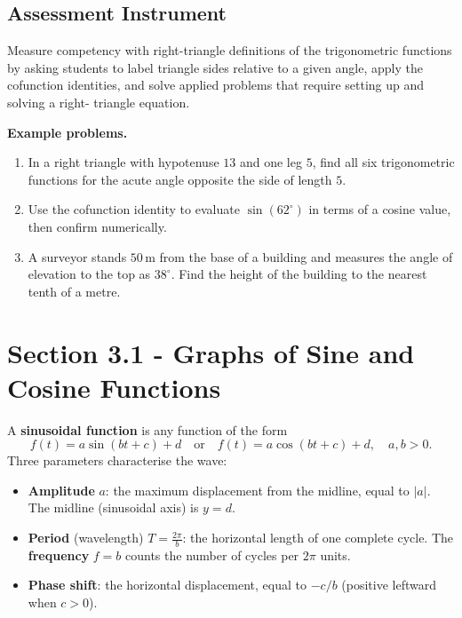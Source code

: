 \subsection{Assessment Instrument}
\label{ssec:asse-3669}

Measure competency with right-triangle definitions of the trigonometric functions by
asking students to label triangle sides relative to a given angle, apply the cofunction
identities, and solve applied problems that require setting up and solving a right-
triangle equation.

\textbf{Example problems.}
\begin{enumerate}
    \item In a right triangle with hypotenuse $13$ and one leg $5$, find all six trigonometric functions for the acute angle opposite the side of length $5$.
    \item Use the cofunction identity to evaluate $\sin(62^{\circ})$ in terms of a cosine value, then confirm numerically.
    \item A surveyor stands $50\,\text{m}$ from the base of a building and measures the angle of elevation to the top as $38^{\circ}$. Find the height of the building to the nearest tenth of a metre.
\end{enumerate}

\section{Section 3.1 - Graphs of Sine and Cosine Functions}
\label{sec:sect-7809}

A \textbf{sinusoidal function} is any function of the form
\[
  f(t) = a\sin(bt + c) + d \quad \text{or} \quad f(t) = a\cos(bt + c) + d,
  \quad a, b > 0.
\]
Three parameters characterise the wave:

\begin{itemize}
  \item \textbf{Amplitude} $a$: the maximum displacement from the midline,
        equal to $|a|$.  The midline (sinusoidal axis) is $y = d$.
  \item \textbf{Period} (wavelength) $T = \frac{2\pi}{b}$: the horizontal
        length of one complete cycle.  The \textbf{frequency} $f = b$ counts
        the number of cycles per $2\pi$ units.
  \item \textbf{Phase shift}: the horizontal displacement, equal to $-c/b$
        (positive leftward when $c > 0$).
\end{itemize}

